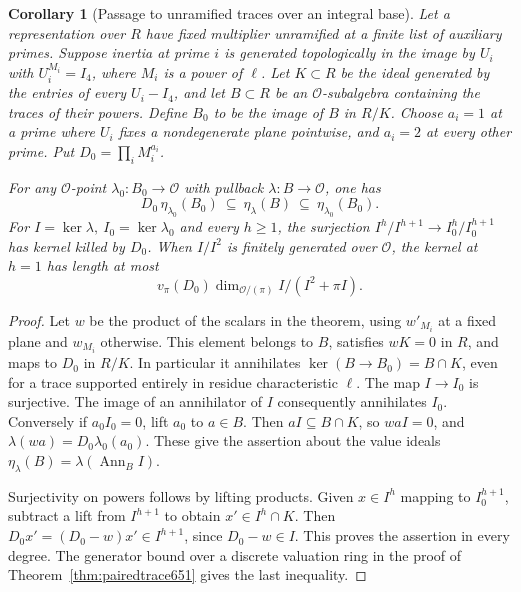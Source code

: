 \documentclass[a4paper,11pt]{article}
\newtheorem{corollary}[proposition]{Corollary}
\theoremstyle{definition}
\theoremstyle{remark}
\numberwithin{equation}{section}
\begin{document}
\begin{corollary}[Passage to unramified traces over an integral base]
\leavevmode\label{cor:verticaltrace654}
Let a representation over \(R\) have fixed multiplier
unramified at a finite list of auxiliary primes. Suppose
inertia at prime \(i\) is generated topologically in the
image by \(U_i\) with \(U_i^{M_i}=I_4\), where \(M_i\)
is a power of \(\ell\). Let \(K\subset R\) be the ideal
generated by the entries of every \(U_i-I_4\), and let
\(B\subset R\) be an \(\mathcal O\)-subalgebra containing
the traces of their powers. Define \(B_0\) to be the image
of \(B\) in \(R/K\).
Choose \(a_i=1\) at a prime where \(U_i\) fixes a
nondegenerate plane pointwise, and \(a_i=2\) at every
other prime. Put \(D_0=\prod_i M_i^{a_i}\).

For any \(\mathcal O\)-point \(\lambda_0:B_0\to\mathcal O\)
with pullback \(\lambda:B\to\mathcal O\), one has
\[
 D_0\,\eta_{\lambda_0}(B_0)\ \subseteq\ \eta_\lambda(B)
                    \ \subseteq\ \eta_{\lambda_0}(B_0).
\]
For \(I=\ker\lambda,\ I_0=\ker\lambda_0\) and every \(h\ge1\),
the surjection \(I^h/I^{h+1}\to I_0^h/I_0^{h+1}\)
has kernel killed by \(D_0\).
When \(I/I^2\) is finitely generated over \(\mathcal O\),
the kernel at \(h=1\) has length at most
\[
             v_\pi(D_0)\dim_{\mathcal O/(\pi)} I/(I^2+\pi I).
\]
\end{corollary}
\begin{proof}
Let \(w\) be the product of the scalars in the theorem, using
\(w'_{M_i}\) at a fixed plane and \(w_{M_i}\) otherwise.
This element belongs to \(B\), satisfies \(wK=0\) in \(R\),
and maps to \(D_0\) in \(R/K\). In particular it annihilates
\(\ker(B\to B_0)=B\cap K\), even for a trace supported
entirely in residue characteristic \(\ell\).
The map \(I\to I_0\) is surjective. The image of an
annihilator of \(I\) consequently annihilates \(I_0\).
Conversely if \(a_0 I_0=0\), lift \(a_0\) to \(a\in B\).
Then \(a I\subseteq B\cap K\), so \(wa I=0\), and
\(\lambda(wa)=D_0\lambda_0(a_0)\).
These give the assertion about the value ideals
\(\eta_\lambda(B)=\lambda(\operatorname{Ann}_B I)\).

Surjectivity on powers follows by lifting products. Given
\(x\in I^h\) mapping to \(I_0^{h+1}\), subtract a lift from
\(I^{h+1}\) to obtain \(x'\in I^h\cap K\).
Then \(D_0 x'=(D_0-w)x'\in I^{h+1}\), since \(D_0-w\in I\).
This proves the assertion in every degree. The generator
bound over a discrete valuation ring in the proof of
Theorem~\ref{thm:pairedtrace651} gives the last inequality.
\end{proof}
\end{document}
